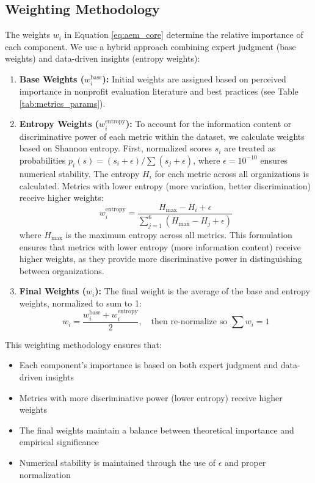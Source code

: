 \documentclass[12pt]{article}
\begin{document}
\subsection{Weighting Methodology} %
The weights $w_i$ in Equation \ref{eq:aem_core} determine the relative importance of each component. We use a hybrid approach combining expert judgment (base weights) and data-driven insights (entropy weights):
\begin{enumerate}
    \item \textbf{Base Weights ($w_i^{\text{base}}$):} Initial weights are assigned based on perceived importance in nonprofit evaluation literature and best practices (see Table \ref{tab:metrics_params}).
    
    \item \textbf{Entropy Weights ($w_i^{\text{entropy}}$):} To account for the information content or discriminative power of each metric within the dataset, we calculate weights based on Shannon entropy. First, normalized scores $s_i$ are treated as probabilities $p_i(s) = (s_i + \epsilon) / \sum (s_j + \epsilon)$, where $\epsilon=10^{-10}$ ensures numerical stability. The entropy $H_i$ for each metric across all organizations is calculated. Metrics with lower entropy (more variation, better discrimination) receive higher weights:
    \begin{equation} \label{eq:entropy_weight}
        w_i^{\text{entropy}} = \frac{H_{\max} - H_i + \epsilon}{\sum_{j=1}^{6} (H_{\max} - H_j + \epsilon)}
\end{equation}
    where $H_{\max}$ is the maximum entropy across all metrics. This formulation ensures that metrics with lower entropy (more information content) receive higher weights, as they provide more discriminative power in distinguishing between organizations.

    \item \textbf{Final Weights ($w_i$):} The final weight is the average of the base and entropy weights, normalized to sum to 1:
    \begin{equation} \label{eq:final_weight}
        w_i = \frac{w_i^{\text{base}} + w_i^{\text{entropy}}}{2}, \quad \text{then re-normalize so } \sum w_i = 1
\end{equation}
\end{enumerate}

This weighting methodology ensures that:
\begin{itemize}
    \item Each component's importance is based on both expert judgment and data-driven insights
    \item Metrics with more discriminative power (lower entropy) receive higher weights
    \item The final weights maintain a balance between theoretical importance and empirical significance
    \item Numerical stability is maintained through the use of $\epsilon$ and proper normalization
\end{itemize}
\end{document}
